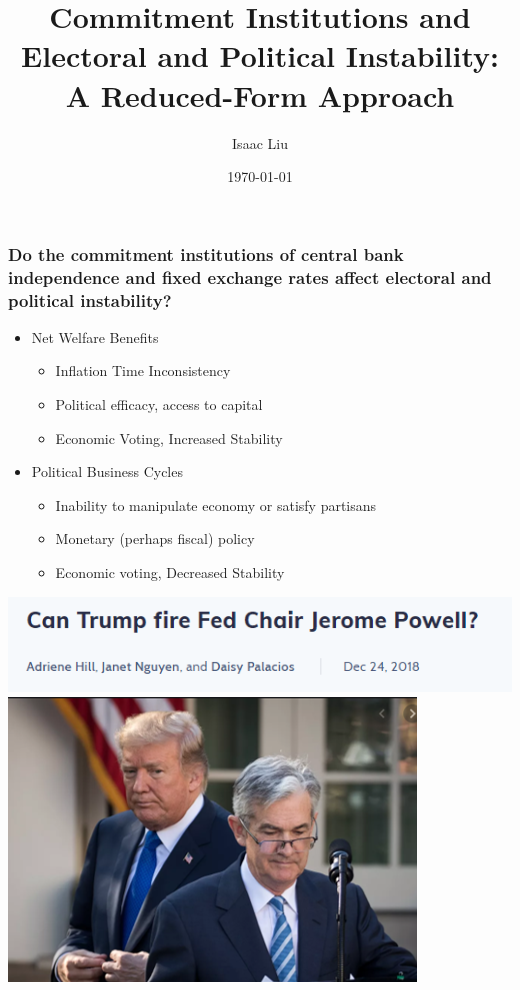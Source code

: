 \documentclass[]{beamer}
\title{Commitment Institutions and Electoral and Political Instability: A Reduced-Form Approach}
\author{Isaac Liu}
\date{\today}
\begin{document}
\begin{frame}
    \titlepage
\end{frame}

\begin{frame}
    \frametitle{Do the commitment institutions of central bank independence and fixed exchange rates affect electoral and political instability?}
    \begin{itemize}
        \item Net Welfare Benefits
        \begin{itemize}
            \item Inflation Time Inconsistency
            \item Political efficacy, access to capital
            \item Economic Voting, Increased Stability
        \end{itemize}
        \item Political Business Cycles
        \begin{itemize}
            \item Inability to manipulate economy or satisfy partisans
            \item Monetary (perhaps fiscal) policy
            \item Economic voting, Decreased Stability
        \end{itemize}
    \end{itemize}
    \includegraphics{img0000.png}
    \includegraphics{img0001.png}
\end{frame}
\end{document}
